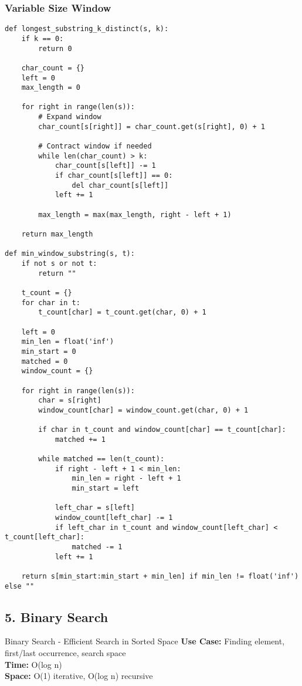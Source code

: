 \documentclass[10pt,a4paper]{article}
\begin{document}
\subsubsection{Variable Size Window}
\begin{lstlisting}
def longest_substring_k_distinct(s, k):
    if k == 0:
        return 0

    char_count = {}
    left = 0
    max_length = 0

    for right in range(len(s)):
        # Expand window
        char_count[s[right]] = char_count.get(s[right], 0) + 1

        # Contract window if needed
        while len(char_count) > k:
            char_count[s[left]] -= 1
            if char_count[s[left]] == 0:
                del char_count[s[left]]
            left += 1

        max_length = max(max_length, right - left + 1)

    return max_length

def min_window_substring(s, t):
    if not s or not t:
        return ""

    t_count = {}
    for char in t:
        t_count[char] = t_count.get(char, 0) + 1

    left = 0
    min_len = float('inf')
    min_start = 0
    matched = 0
    window_count = {}

    for right in range(len(s)):
        char = s[right]
        window_count[char] = window_count.get(char, 0) + 1

        if char in t_count and window_count[char] == t_count[char]:
            matched += 1

        while matched == len(t_count):
            if right - left + 1 < min_len:
                min_len = right - left + 1
                min_start = left

            left_char = s[left]
            window_count[left_char] -= 1
            if left_char in t_count and window_count[left_char] < t_count[left_char]:
                matched -= 1
            left += 1

    return s[min_start:min_start + min_len] if min_len != float('inf') else ""
\end{lstlisting}

\subsection{5. Binary Search}

\begin{patternbox}{Binary Search - Efficient Search in Sorted Space}
\textbf{Use Case:} Finding element, first/last occurrence, search space\\
\textbf{Time:} O(log n)\\
\textbf{Space:} O(1) iterative, O(log n) recursive
\end{patternbox}
\end{document}

